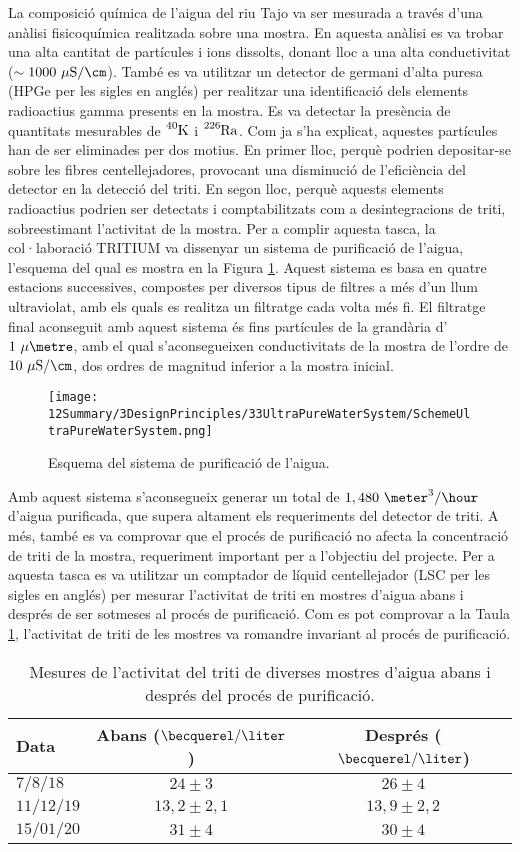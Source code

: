 La composició química de l'aigua del riu Tajo va ser mesurada a través d'una anàlisi fisicoquímica realitzada sobre una mostra. En aquesta anàlisi es va trobar una alta cantitat de partícules i ions dissolts, donant lloc a una alta conductivitat ($\sim 1000~\mu\text{S}/\cm$). També es va utilitzar un detector de germani d'alta puresa (HPGe per les sigles en anglés) per realitzar una identificació dels elements radioactius gamma presents en la mostra. Es va detectar la presència de quantitats mesurables de $\ce{^{40}K}$ i $\ce{^{226}Ra}$. Com ja s'ha explicat, aquestes partícules han de ser eliminades per dos motius. En primer lloc, perquè podrien depositar-se sobre les fibres centellejadores, provocant una disminució de l'eficiència del detector en la detecció del triti. En segon lloc, perquè aquests elements radioactius podrien ser detectats i comptabilitzats com a desintegracions de triti, sobreestimant l'activitat de la mostra. Per a complir aquesta tasca, la col·laboració TRITIUM va dissenyar un sistema de purificació de l'aigua, l'esquema del qual es mostra en la Figura \ref{fig:EsquemaSistemaAiguaUltrapura}. Aquest sistema es basa en quatre estacions successives, compostes per diversos tipus de filtres a més d'un llum ultraviolat, amb els quals es realitza un filtratge cada volta més fi. El filtratge final aconseguit amb aquest sistema és fins partícules de la grandària d'$1~\mu\metre$, amb el qual s'aconsegueixen conductivitats de la mostra de l'ordre de $10~\mu\text{S}/\cm$, dos ordres de magnitud inferior a la mostra inicial.
\begin{figure}[htbp]
\centering
\texttt{[image: 12Summary/3DesignPrinciples/33UltraPureWaterSystem/SchemeUltraPureWaterSystem.png]}
\caption{Esquema del sistema de purificació de l'aigua.\label{fig:EsquemaSistemaAiguaUltrapura}}
\end{figure}
Amb aquest sistema s'aconsegueix generar un total de $1,480~\meter^3/\hour$ d'aigua purificada, que supera altament els requeriments del detector de triti. A més, també es va comprovar que el procés de purificació no afecta la concentració de triti de la mostra, requeriment important per a l'objectiu del projecte. Per a aquesta tasca es va utilitzar un comptador de líquid centellejador (LSC per les sigles en anglés) per mesurar l'activitat de triti en mostres d'aigua abans i després de ser sotmeses al procés de purificació. Com es pot comprovar a la Taula \ref{tab:ValorsActivitatTriti}, l'activitat de triti de les mostres va romandre invariant al procés de purificació.

\begin{table}[htbp]
\centering{}%
\begin{tabular}{lcc}
\toprule 
Data & Abans ($\becquerel/\liter$) & Després ($\becquerel/\liter$) \tabularnewline
\midrule
\midrule 
$7/8/18$ & $24 \pm 3$ & $26 \pm 4$ \tabularnewline
$11/12/19$ & $13,2 \pm 2,1$ & $13,9 \pm 2,2$ \tabularnewline
$15/01/20$ & $31 \pm 4$ & $30 \pm 4$ \tabularnewline
\bottomrule
\end{tabular}
\caption{Mesures de l'activitat del triti de diverses mostres d'aigua abans i després del procés de purificació.}
\label{tab:ValorsActivitatTriti}
\end{table}

